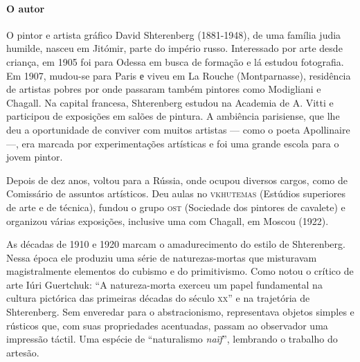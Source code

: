 \documentclass[11pt]{extarticle}
\begin{document}

\paragraph{O autor} O pintor e artista gráfico David Shterenberg (1881-1948), de uma família judia humilde, nasceu em Jitómir, parte do império russo. Interessado por arte desde criança, em 1905 foi para Odessa em busca de formação e lá estudou fotografia. Em 1907, mudou-se para Paris е viveu em La Rouche (Montparnasse), residência de artistas pobres por onde passaram também pintores como Modigliani e Chagall. Na capital francesa, Shterenberg estudou na Academia de A. Vitti e participou de exposições em salões de pintura. A ambiência parisiense, que lhe deu a oportunidade de conviver com muitos artistas --- como o poeta Apollinaire ---, era marcada por experimentações artísticas e foi uma grande escola para o jovem pintor. 

Depois de dez anos, voltou para a Rússia, onde ocupou diversos cargos, como de Comissário de assuntos artísticos. Deu aulas no 	\textsc{vkhutemas} (Estúdios superiores de arte e de técnica), fundou o grupo \textsc{ost} (Sociedade dos pintores de cavalete) e organizou várias exposições, inclusive uma com Chagall, em Moscou (1922). 

As décadas de 1910 e 1920 marcam o amadurecimento do estilo de Shterenberg. Nessa época ele produziu uma série de naturezas-mortas que misturavam magistralmente elementos do cubismo e do primitivismo. Como notou o crítico de arte Iúri Guertchuk: “A natureza-morta exerceu um papel fundamental na cultura pictórica das primeiras décadas do século \textsc{xx}” e na trajetória de Shterenberg. Sem enveredar para o abstracionismo, representava objetos simples e rústicos que, com suas propriedades acentuadas, passam ao observador uma impressão táctil. Uma espécie de “naturalismo \textit{naïf}”, lembrando o trabalho do artesão. 
\end{document}
